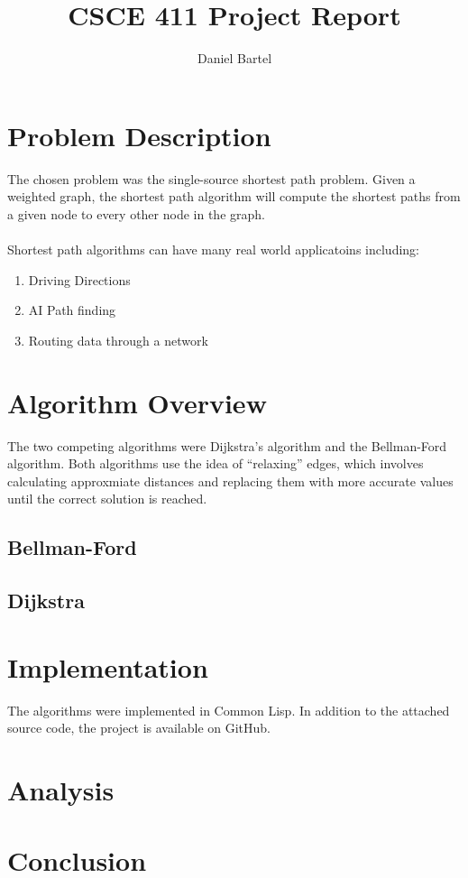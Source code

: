 \documentclass{article}
\title{CSCE 411 Project Report}
\author{Daniel Bartel}
\date{}
\begin{document}
  \maketitle
  \section*{Problem Description}
  The chosen problem was the single-source shortest path problem. Given a weighted graph, the shortest path algorithm will compute the shortest paths from a given node to every other node in the graph.
\\ \ \\
Shortest path algorithms can have many real world applicatoins including:
\begin{enumerate}
  \item[\textbullet] Driving Directions
  \item[\textbullet] AI Path finding
  \item[\textbullet] Routing data through a network
\end{enumerate}
  \section*{Algorithm Overview}
  The two competing algorithms were Dijkstra's algorithm and the Bellman-Ford algorithm. Both algorithms use the idea of ``relaxing'' edges, which involves calculating approxmiate distances and replacing them with more accurate values until the correct solution is reached.
    \subsection*{Bellman-Ford}
    \subsection*{Dijkstra}
  \section*{Implementation}
The algorithms were implemented in Common Lisp. In addition to the attached source code, the project is available on GitHub.
  \section*{Analysis}
  \section*{Conclusion}
\end{document}
